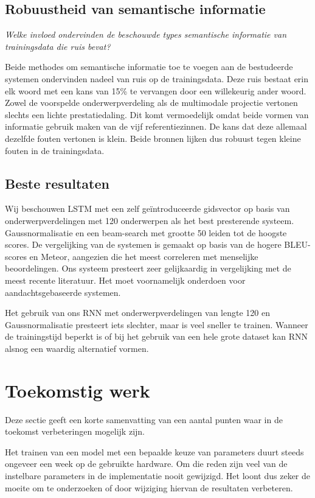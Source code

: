 \subsection{Robuustheid van semantische informatie}
\emph{Welke invloed ondervinden de beschouwde types semantische informatie van trainingsdata die ruis bevat?}

Beide methodes om semantische informatie toe te voegen aan de bestudeerde systemen ondervinden nadeel van ruis op de trainingsdata. Deze ruis bestaat erin elk woord met een kans van 15\% te vervangen door een willekeurig ander woord. Zowel de voorspelde onderwerpverdeling als de multimodale projectie vertonen slechts een lichte prestatiedaling. Dit komt vermoedelijk omdat beide vormen van informatie gebruik maken van de vijf referentiezinnen. De kans dat deze allemaal dezelfde fouten vertonen is klein. Beide bronnen lijken dus robuust tegen kleine fouten in de trainingsdata.

\subsection{Beste resultaten}
Wij beschouwen LSTM met een zelf ge\"introduceerde gidsvector op basis van onderwerpverdelingen met 120 onderwerpen als het best presterende systeem. Gaussnormalisatie en een beam-search met grootte 50 leiden tot de hoogste scores.  De vergelijking van de systemen is gemaakt op basis van de hogere BLEU-scores en Meteor, aangezien die het meest correleren met menselijke beoordelingen. Ons systeem presteert zeer gelijkaardig in vergelijking met de meest recente literatuur. Het moet voornamelijk onderdoen voor aandachtsgebaseerde systemen. 

Het gebruik van ons RNN met onderwerpverdelingen van lengte 120 en Gaussnormalisatie presteert iets slechter, maar is veel sneller te trainen. Wanneer de trainingstijd beperkt is of bij het gebruik van een hele grote dataset kan RNN alsnog een waardig alternatief vormen.

\section{Toekomstig werk}
Deze sectie geeft een korte samenvatting van een aantal punten waar in de toekomst verbeteringen mogelijk zijn.

Het trainen van een model met een bepaalde keuze van parameters duurt steeds ongeveer een week op de gebruikte hardware. Om die reden zijn veel van de instelbare parameters in de implementatie nooit gewijzigd. Het loont dus zeker de moeite om te onderzoeken of door wijziging hiervan de resultaten verbeteren.

